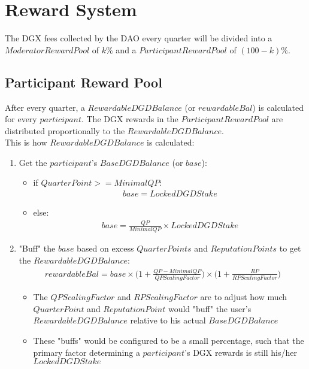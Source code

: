 \documentclass[11pt,a4paper,titlepage]{article}
\begin{document}
\section{Reward System}{
	The DGX fees collected by the DAO every quarter will be divided into a $Moderator Reward Pool$ of $k\%$ and a $Participant Reward Pool$ of $(100-k)\%$.
	\subsection{Participant Reward Pool}{
		After every quarter, a $Rewardable DGD Balance$ (or $rewardableBal$) is calculated for every $participant$. The DGX rewards in the $ParticipantRewardPool$ are distributed proportionally to the $Rewardable DGD Balance$.\\
		This is how $Rewardable DGD Balance$ is calculated:
		\begin{enumerate}
			\item Get the $participant$'s $Base DGD Balance$ (or $base$):
			\begin{itemize}
				\item if $Quarter Point >= MinimalQP$:
				\begin{align*}
					base = LockedDGDStake
				\end{align*}
				\item else:
				\begin{align*}
					base = \frac{QP}{MinimalQP} \times LockedDGDStake
				\end{align*}
			\end{itemize}
			\item "Buff" the $base$ based on excess $QuarterPoints$ and $ReputationPoints$ to get the $Rewardable DGD Balance$:
			\begin{align*}
				rewardableBal = base \times \Bigg( 1+\frac{QP-MinimalQP}{QPScalingFactor} \Bigg) \times \Bigg(1+\frac{RP}{RPScalingFactor} \Bigg)
			\end{align*}
			\begin{itemize}
				\item The $QPScalingFactor$ and $RPScalingFactor$ are to adjust how much $QuarterPoint$ and $ReputationPoint$ would "buff" the user's $RewardableDGDBalance$ relative to his actual $BaseDGDBalance$
				\item These "buffs" would be configured to be a small percentage, such that the primary factor determining a $participant$'s DGX rewards is still his/her $LockedDGDStake$
			\end{itemize}
		\end{enumerate}
	}
}
\end{document}
